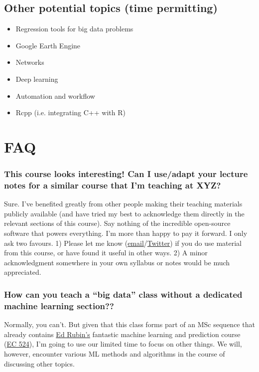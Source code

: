\documentclass[12]{article}
\begin{document}
\subsection*{Other potential topics (time permitting)}

\begin{itemize}
	\item Regression tools for big data problems
	\item Google Earth Engine
	\item Networks
	\item Deep learning
	\item Automation and workflow
	\item Rcpp (i.e. integrating C++ with R)
\end{itemize}

\newpage
\section*{FAQ}

\vspace{-0.25cm}
\subsubsection*{This course looks interesting! Can I use/adapt your lecture notes for a similar course that I'm teaching at XYZ?}
Sure. I've benefited greatly from other people making their teaching materials publicly available (and have tried my best to acknowledge them directly in the relevant sections of this course). Say nothing of the incredible open-source software that powers everything. I'm more than happy to pay it forward. I only ask two favours. 1) Please let me know (\href{mailto:grantmcd@uoregon.edu}{email}/\href{https://twitter.com/grant_mcdermott}{Twitter}) if you do use material from this course, or have found it useful in other ways. 2) A minor acknowledgment somewhere in your own syllabus or notes would be much appreciated.

\vspace{-0.25cm}
\subsubsection*{How can you teach a ``big data'' class without a dedicated machine learning section??}
Normally, you can't. But given that this class forms part of an MSc sequence that already contains \href{https://edrub.in/}{Ed Rubin's} fantastic machine learning and prediction course (\href{https://github.com/edrubin/EC524W20}{EC 524}), I'm going to use our limited time to focus on other things. We will, however, encounter various ML methods and algorithms in the course of discussing other topics.
\end{document}
